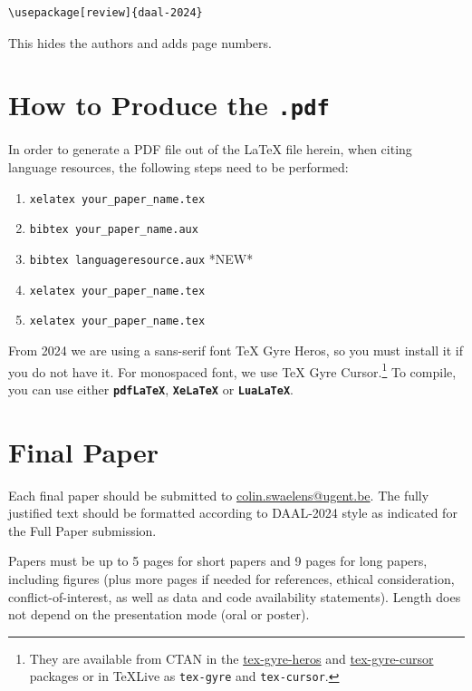 \documentclass[10pt, a4paper]{article}
\begin{document}
\begin{verbatim}
\usepackage[review]{daal-2024}
\end{verbatim}

This hides the authors and adds page numbers.

\section{How to Produce the \texttt{.pdf}}
\label{sec:append-how-prod}


In order to generate a PDF file out of the LaTeX file herein, when citing language resources, the following steps need to be performed:

\begin{enumerate}
\item \texttt{xelatex your\_paper\_name.tex}
\item \texttt{bibtex your\_paper\_name.aux}
\item \texttt{bibtex languageresource.aux}    *NEW*
\item \texttt{xelatex your\_paper\_name.tex}
\item \texttt{xelatex your\_paper\_name.tex}
\end{enumerate}

From 2024 we are using a sans-serif font TeX Gyre Heros, so you must
install it if you do not have it.  For monospaced font, we use TeX
Gyre Cursor.\footnote{They are available from CTAN in the
  \href{https://ctan.org/pkg/tex-gyre-heros}{tex-gyre-heros} and
  \href{https://ctan.org/pkg/tex-gyre-cursor}{tex-gyre-cursor} packages
    or in TeXLive as \texttt{tex-gyre} and \texttt{tex-cursor}.}  To
  compile, you can use either \textbf{\texttt{pdfLaTeX}},
  \textbf{\texttt{XeLaTeX}} or \textbf{\texttt{LuaLaTeX}}.

\section{Final Paper}

Each final paper should be submitted to \underline{colin.swaelens@ugent.be}. The fully justified text should be formatted according to DAAL-2024 style as indicated for the Full Paper submission.

Papers must be up to 5 pages for short papers and 9 pages for long
papers, including figures (plus more pages if needed for references,
ethical consideration, conflict-of-interest, as well as data and code
availability statements).  Length does not depend on the presentation
mode (oral or poster).
\end{document}
